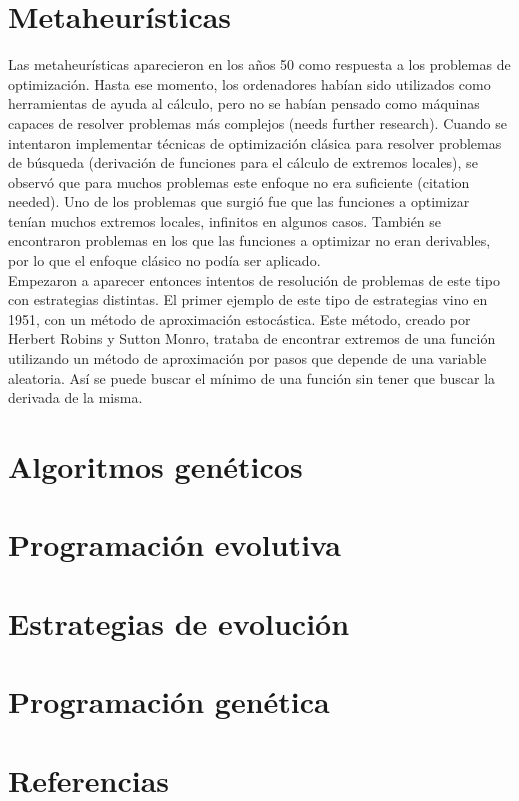 \documentclass[12pt]{article} \usepackage[utf8x]{inputenc}
\begin{document}
\section{Metaheurísticas}

Las metaheurísticas aparecieron en los años 50 como respuesta a los
problemas de optimización. Hasta ese momento, los ordenadores habían
sido utilizados como herramientas de ayuda al cálculo, pero no se
habían pensado como máquinas capaces de resolver problemas más
complejos (needs further research). Cuando se intentaron implementar
técnicas de optimización clásica para resolver problemas de búsqueda
(derivación de funciones para el cálculo de extremos locales), se
observó que para muchos problemas este enfoque no era suficiente
(citation needed). Uno de los problemas que surgió fue que las
funciones a optimizar tenían muchos extremos locales, infinitos en
algunos casos. También se encontraron problemas en los que las
funciones a optimizar no eran derivables, por lo que el enfoque
clásico no podía
ser aplicado.\\

Empezaron a aparecer entonces intentos de resolución de problemas de
este tipo con estrategias distintas. El primer ejemplo de este tipo de
estrategias vino en 1951, con un método de aproximación estocástica.
Este método, creado por Herbert Robins y Sutton Monro, trataba de
encontrar extremos de una función utilizando un método de aproximación
por pasos que depende de una variable aleatoria. Así se puede buscar
el mínimo de una función sin tener que buscar la derivada de la misma.\\

\section{Algoritmos genéticos}

\section{Programación evolutiva}

\section{Estrategias de evolución}

\section{Programación genética}

\section{Referencias}
\end{document}
